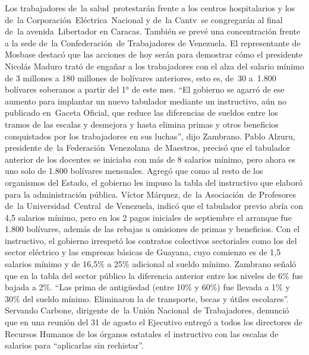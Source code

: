 \documentclass{article}%
\begin{document}
\newline%
%
Los trabajadores de~la salud~protestarán frente a los centros hospitalarios y los de~la Corporación~Eléctrica~Nacional y de~la Cantv~se congregarán al final de~la avenida~Libertador en Caracas. También se prevé una concentración frente a la sede de~la Confederación~de Trabajadores de Venezuela.%
\newline%
%
El representante de Mosbase destacó que las acciones de hoy serán para demostrar cómo el presidente Nicolás Maduro trató de engañar a los trabajadores con el alza del salario mínimo de 3 millones a 180 millones de bolívares anteriores, esto es, de~30 a~1.800 bolívares soberanos a partir del 1° de este mes.%
\newline%
%
“El gobierno se agarró de ese aumento para implantar un nuevo tabulador mediante un instructivo, aún no publicado en~Gaceta Oficial, que reduce las diferencias de sueldos entre los tramos de las escalas y desmejora y hasta elimina primas y otros beneficios conquistados por los trabajadores en sus luchas”, dijo Zambrano.%
\newline%
%
Pablo Alzuru, presidente de~la Federación~Venezolana~de Maestros, precisó que el tabulador anterior de los docentes se iniciaba con más de 8 salarios mínimo, pero ahora es uno solo de 1.800 bolívares mensuales. Agregó que como al resto de los organismos del Estado, el gobierno les impuso la tabla del instructivo que elaboró para la administración pública.%
\newline%
%
Víctor Márquez, de~la Asociación~de Profesores de~la Universidad~Central~de Venezuela, indicó que el tabulador previo abría con 4,5 salarios mínimo, pero en los 2 pagos iniciales de septiembre el arranque fue 1.800 bolívares, además de las rebajas u omisiones de primas y beneficios.%
\newline%
%
Con el instructivo, el gobierno irrespetó los contratos colectivos sectoriales como los del sector eléctrico y las empresas básicas de Guayana, cuyo comienzo es de 1,5 salarios mínimo y de 16,5\% a 25\% adicional al sueldo mínimo.%
\newline%
%
Zambrano señaló que en la tabla del sector público la diferencia anterior entre los niveles de 6\% fue bajada a 2\%. “Las prima de antigüedad (entre 10\% y 60\%) fue llevada a 1\% y 30\% del sueldo mínimo. Eliminaron la de transporte, becas y útiles escolares”.%
\newline%
%
Servando Carbone, dirigente de~la Unión Nacional~de Trabajadores, denunció que en una reunión del 31 de agosto el Ejecutivo entregó a todos los directores de Recursos Humanos de los órganos estatales el instructivo con las escalas de salarios para “aplicarlas sin rechistar”.%
\end{document}
